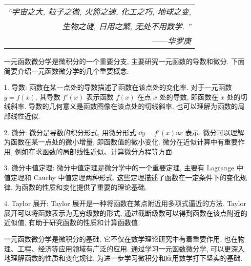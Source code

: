 \begin{flushright}
    \begin{tabular}{r|}
        \textit{“宇宙之大, 粒子之微, 火箭之速, 化工之巧, 地球之变, }\\
        \textit{生物之谜, 日用之繁, 无处不用数学. ”}\\
        ——\textit{华罗庚}
    \end{tabular}
\end{flushright}

一元函数微分学是微积分的一个重要分支, 主要研究一元函数的导数和微分. 下面简要介绍一元函数微分学的几个重要概念: 

1. 导数: 函数在某一点处的导数描述了函数在该点处的变化率. 对于一元函数 $y = f(x)$, 其导数 $f'(x)$ 表示函数 $f(x)$ 在点 $x$ 处的导数, 即函数在 $x$ 处的切线斜率. 导数的几何意义是函数图像在该点处的切线斜率, 也可以理解为函数的局部线性近似. 

2. 微分: 微分是导数的积分形式, 用微分形式 $\dd y = f'(x)\dd x$ 表示. 微分可以理解为函数在某一点处的微小增量, 即函数值的微小变化. 微分在近似计算中有重要作用, 例如在求函数的局部线性近似、计算微分方程等方面. 

3. 微分中值定理: 微分中值定理是微分学中的一个重要定理, 主要有 Lagrange 中值定理和 Cauchy 中值定理两种形式. 这些定理描述了函数在一定条件下的变化规律, 为函数的性质和变化提供了重要的理论基础. 

4. Taylor 展开: Taylor 展开是一种将函数在某点附近用多项式逼近的方法. Taylor 展开可以将函数表示为无穷级数的形式, 通过截断级数可以得到函数在该点附近的近似值, 有助于研究函数的性质和计算函数值. 

一元函数微分学是微积分的基础, 它不仅在数学理论研究中有着重要作用, 也在物理、工程、经济等应用领域有广泛的应用. 通过学习一元函数微分学, 可以更深入地理解函数的性质和变化规律, 为进一步学习微积分和应用数学打下坚实的基础. 